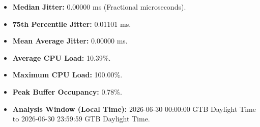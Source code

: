 
\begin{itemize}
    \item \textbf{Median Jitter:} 0.00000 ms (Fractional microseconds).
    \item \textbf{75th Percentile Jitter:} 0.01101 ms.
    \item \textbf{Mean Average Jitter:} 0.00000 ms.
    \item \textbf{Average CPU Load:} 10.39\%.
    \item \textbf{Maximum CPU Load:} 100.00\%.
    \item \textbf{Peak Buffer Occupancy:} 0.78\%.
    \item \textbf{Analysis Window (Local Time):} 2026-06-30 00:00:00 GTB Daylight Time to 2026-06-30 23:59:59 GTB Daylight Time.
\end{itemize}